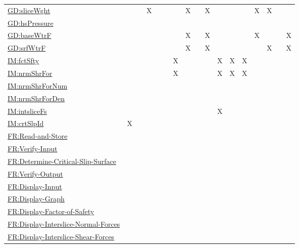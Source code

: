 \documentclass[12pt]{article}
\begin{document}
\begin{longtable}{l l l l l l l l l l l l l l l l l}
\\
\hyperref[GD:sliceWght]{GD:sliceWght} &  &  & X &  &  &  & X &  & X &  &  &  & X & X &  & 
\\
\hyperref[GD:hsPressure]{GD:hsPressure} &  &  &  &  &  &  &  &  &  &  &  &  &  &  &  & 
\\
\hyperref[GD:baseWtrF]{GD:baseWtrF} &  &  &  &  &  &  & X &  & X &  &  &  & X &  &  & X
\\
\hyperref[GD:srfWtrF]{GD:srfWtrF} &  &  &  &  &  &  & X &  & X &  &  &  &  & X &  & X
\\
\hyperref[IM:fctSfty]{IM:fctSfty} &  &  &  &  &  & X &  &  &  & X & X & X &  &  &  & 
\\
\hyperref[IM:nrmShrFor]{IM:nrmShrFor} &  &  &  &  &  & X &  &  &  & X & X & X &  &  &  & 
\\
\hyperref[IM:nrmShrForNum]{IM:nrmShrForNum} &  &  &  &  &  &  &  &  &  &  &  &  &  &  &  & 
\\
\hyperref[IM:nrmShrForDen]{IM:nrmShrForDen} &  &  &  &  &  &  &  &  &  &  &  &  &  &  &  & 
\\
\hyperref[IM:intsliceFs]{IM:intsliceFs} &  &  &  &  &  &  &  &  &  & X &  &  &  &  &  & 
\\
\hyperref[IM:crtSlpId]{IM:crtSlpId} & X &  &  &  &  &  &  &  &  &  &  &  &  &  &  & 
\\
\hyperref[readAndStore]{FR:Read-and-Store} &  &  &  &  &  &  &  &  &  &  &  &  &  &  &  & 
\\
\hyperref[verifyInput]{FR:Verify-Input} &  &  &  &  &  &  &  &  &  &  &  &  &  &  &  & 
\\
\hyperref[determineCritSlip]{FR:Determine-Critical-Slip-Surface} &  &  &  &  &  &  &  &  &  &  &  &  &  &  &  & 
\\
\hyperref[verifyOutput]{FR:Verify-Output} &  &  &  &  &  &  &  &  &  &  &  &  &  &  &  & 
\\
\hyperref[displayInput]{FR:Display-Input} &  &  &  &  &  &  &  &  &  &  &  &  &  &  &  & 
\\
\hyperref[displayGraph]{FR:Display-Graph} &  &  &  &  &  &  &  &  &  &  &  &  &  &  &  & 
\\
\hyperref[displayFS]{FR:Display-Factor-of-Safety} &  &  &  &  &  &  &  &  &  &  &  &  &  &  &  & 
\\
\hyperref[displayNormal]{FR:Display-Interslice-Normal-Forces} &  &  &  &  &  &  &  &  &  &  &  &  &  &  &  & 
\\
\hyperref[displayShear]{FR:Display-Interslice-Shear-Forces} &  &  &  &  &  &  &  &  &  &  &  &  &  &  &  & 
\\

\end{longtable}
\end{document}

